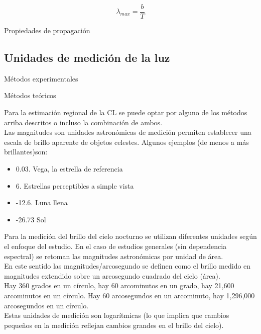\begin{equation}
\lambda_{max}=\dfrac{b}{T}
\end{equation}


Propiedades de propagación

\subsection{Unidades de medición de la luz}

Métodos experimentales

Métodos teóricos

Para la estimación regional de la CL se puede optar por alguno de los métodos arriba descritos o incluso la combinación de ambos.\\

Las magnitudes son unidades astronómicas de medición permiten establecer una escala de brillo aparente de objetos celestes. Algunos ejemplos (de menos a más brillantes)son:

\begin{itemize}

    \item 0.03. Vega, la estrella de referencia
    \item 6. Estrellas perceptibles a simple vista
    \item -12.6. Luna llena
    \item -26.73 Sol
    
 \end{itemize}
 
 Para la medición del brillo del cielo nocturno se utilizan diferentes unidades según el enfoque del estudio. En el caso de estudios generales (sin dependencia espectral) se retoman las magnitudes astronómicas por unidad de área.\\
 
En este sentido las magnitudes/arcosegundo se definen como el brillo medido en magnitudes extendido sobre un arcosegundo cuadrado del cielo (área).\\

Hay 360 grados en un círculo, hay 60 arcominutos en un grado, hay 21,600 arcominutos en un círculo. Hay 60 arcosegundos en un arcominuto, hay 1,296,000 arcosegundos en un círculo.\\

Estas unidades de medición son logarítmicas (lo que implica que cambios pequeños en la medición reflejan cambios grandes en el brillo del cielo).\\


